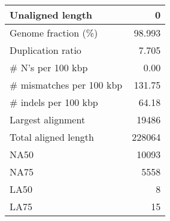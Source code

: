 \documentclass[12pt,a4paper]{article}
\begin{document}
\begin{table}[ht]
\begin{center}
\begin{tabular}{|l*{1}{|r}|}
Unaligned length & 0 \\ \hline
Genome fraction (\%) & 98.993 \\ \hline
Duplication ratio & 7.705 \\ \hline
\# N's per 100 kbp & 0.00 \\ \hline
\# mismatches per 100 kbp & 131.75 \\ \hline
\# indels per 100 kbp & 64.18 \\ \hline
Largest alignment & 19486 \\ \hline
Total aligned length & 228064 \\ \hline
NA50 & 10093 \\ \hline
NA75 & 5558 \\ \hline
LA50 & 8 \\ \hline
LA75 & 15 \\ \hline
\end{tabular}
\end{center}
\end{table}
\end{document}
